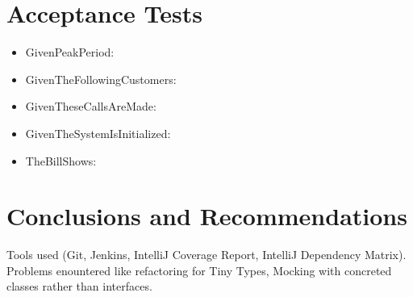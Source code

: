 \documentclass{article}
\begin{document}

\section{Acceptance Tests} %
\begin{itemize}
\item GivenPeakPeriod: 
\item GivenTheFollowingCustomers: 
\item GivenTheseCallsAreMade:
\item GivenTheSystemIsInitialized:
\item TheBillShows:
\end{itemize}


\section{Conclusions and Recommendations} %
Tools used (Git, Jenkins, IntelliJ Coverage Report, IntelliJ Dependency Matrix).  Problems enountered like refactoring for Tiny Types, Mocking with concreted classes rather than interfaces.
\end{document}
